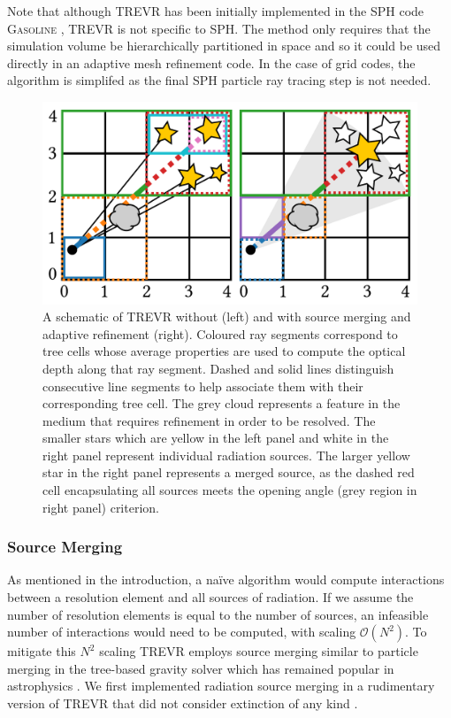 \documentclass[fleq,usenatbib]{mnras}
\newcommand{\acro}{TREVR}
\newcommand{\bigO}[1]{\mathcal{O}\left(#1\right)}
\begin{document}
{Note that although \acro{} has been initially implemented in the 
SPH code \textsc{Gasoline} \citep{wadsleyEt17}, \acro{} is not specific to 
SPH.  The method only requires that the 
simulation volume be hierarchically partitioned in space and so it could be 
used directly in an adaptive mesh refinement code.   In the case of grid codes,
the algorithm is simplifed as the final SPH particle ray tracing step is not needed.
 
\begin{figure}
\includegraphics[width=1\linewidth]{Figures/algorithm.pdf}
\caption{A schematic of \acro{} without (left) and with source merging and 
adaptive refinement (right). Coloured ray segments correspond to tree cells 
whose average properties are used to compute the optical depth along that ray 
segment. Dashed and solid lines distinguish consecutive line segments to 
help associate them with their corresponding tree cell. The grey cloud 
represents a feature in the medium that requires refinement in order to be 
resolved. The smaller stars which are yellow in the left panel and white in 
the right panel represent individual radiation sources. The larger yellow star 
in the right panel represents a merged source, as the dashed red cell 
encapsulating all sources meets the opening angle (grey region in right panel) 
criterion.} 
\label{fig:algorithm}
\end{figure}

\subsubsection{Source Merging}
As mentioned in the introduction, a na\"ive algorithm would compute 
interactions between a resolution element and  all sources of radiation. If we 
assume the number of resolution elements is equal to the number of sources, 
an infeasible number of interactions would need to be computed, with scaling
$\bigO{N^2}$. To mitigate this $N^2$ scaling \acro{} employs source merging 
similar to particle merging in the \cite{barnesHut86} tree-based gravity 
solver which has remained popular in astrophysics 
\citep{benz88,vineSigurdsson98,springelEt01,wadsleyEt04,hubberEt11}. We first
implemented radiation source merging in a rudimentary version of \acro{} 
that did not consider extinction of any kind \citep{kannanEt14}.

}
\end{document}
